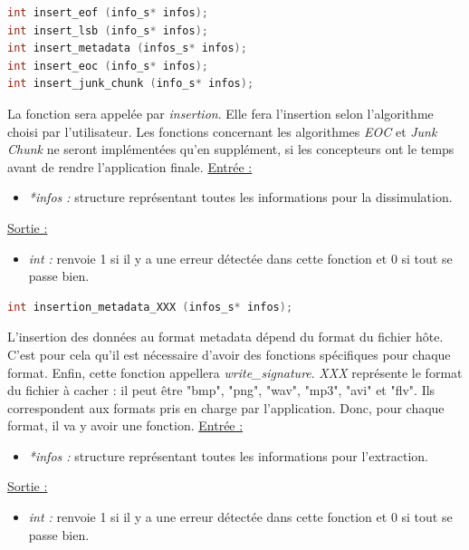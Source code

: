 \documentclass[11pt]{article}
\begin{document}
\begin{lstlisting}[language=c]
int insert_eof (info_s* infos); 
int insert_lsb (info_s* infos);
int insert_metadata (infos_s* infos);
int insert_eoc (info_s* infos);
int insert_junk_chunk (info_s* infos);
\end{lstlisting}

La fonction sera appelée par \textit{insertion}.
Elle fera l'insertion selon l'algorithme choisi par l'utilisateur. 
Les fonctions concernant les algorithmes \textit{EOC} et \textit{Junk Chunk} 
ne seront implémentées qu'en supplément, si les concepteurs ont le temps 
avant de rendre l'application finale. 
\newline
\underline{Entrée :} 
\begin{itemize}
\item \textit{*infos :} structure représentant toutes les informations pour 
la dissimulation.  
\end{itemize}
\underline{Sortie :} 
\begin{itemize}
\item \textit{int :} renvoie 1 si il y a une erreur détectée dans cette 
fonction et 0 si tout se passe bien.  
\newline 
\end{itemize}

\begin{lstlisting}[language=c]
int insertion_metadata_XXX (infos_s* infos);
\end{lstlisting}

L'insertion des données au format metadata dépend du format du fichier hôte. 
C'est pour cela qu'il est nécessaire d'avoir des fonctions spécifiques pour 
chaque format. 
Enfin, cette fonction appellera \textit{write\_signature}.
\textit{XXX} représente le format du fichier à cacher : il peut être 
"bmp", "png", "wav", "mp3", "avi" et "flv". Ils correspondent aux formats 
pris en charge par l'application. Donc, pour chaque format, il va y avoir 
une fonction.  
\newline
\underline{Entrée :} 
\begin{itemize}
\item \textit{*infos :} structure représentant toutes les informations pour 
l'extraction. 
\end{itemize}
\underline{Sortie :} 
\begin{itemize}
\item \textit{int :} renvoie 1 si il y a une erreur détectée dans cette 
fonction et 0 si tout se passe bien.  
\newline 
\end{itemize}
\end{document}
